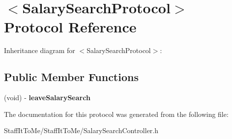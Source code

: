 \hypertarget{protocol_salary_search_protocol-p}{
\section{$<$\-Salary\-Search\-Protocol$>$ \-Protocol \-Reference}
\label{protocol_salary_search_protocol-p}
}


\-Inheritance diagram for $<$\-Salary\-Search\-Protocol$>$\-:
\subsection*{\-Public \-Member \-Functions}
\begin{DoxyCompactItemize}
\item 
\hypertarget{protocol_salary_search_protocol-p_a9bfc38a11c7d39adf2846dc67e9430e5}{
(void) -\/ {\bfseries leave\-Salary\-Search}}
\label{protocol_salary_search_protocol-p_a9bfc38a11c7d39adf2846dc67e9430e5}

\end{DoxyCompactItemize}


\-The documentation for this protocol was generated from the following file\-:\begin{DoxyCompactItemize}
\item 
\-Staff\-It\-To\-Me/\-Staff\-It\-To\-Me/\-Salary\-Search\-Controller.\-h\end{DoxyCompactItemize}
